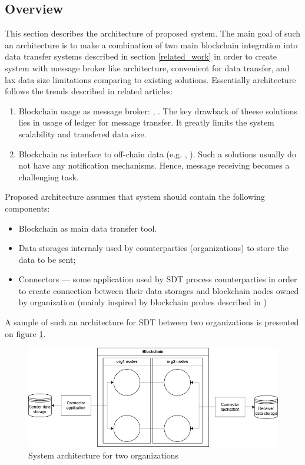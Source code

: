 \documentclass[10pt]{llncs}
\begin{document}
\subsection{Overview}

This section describes the architecture of proposed system.
The main goal of such an architecture is to make a combination of two main blockchain integration into data transfer systems described in section \ref{related_work}
in order to create system with message broker like architecture, convenient for data transfer, and lax data size limitations comparing to existing solutions.
Essentially architecture follows the trends described in related articles:

\begin{enumerate}
    \item Blockchain usage as message broker: \cite{Ghaemi2021}, \cite{kim2020hybrid}. 
    The key drawback of theese solutions lies in usage of ledger for message transfer.
    It greatly limits the system scalability and transfered data size. 
    \item Blockchain as interface to off-chain data (e.g. \cite{Jia2023}, \cite{Wang2024}).
    Such a solutions usually do not have any notification mechanisms.
    Hence, message receiving becomes a challenging task.
\end{enumerate}

Proposed architecture assumes that system should contain the following components:

\begin{itemize}
    \item Blockchain as main data transfer tool. 
    \item Data storages internaly used by counterparties (organizations) to store the data to be sent;
    \item Connectors --- some application used by SDT process counterparties in order to create connection between their data storages
    and blockchain nodes owned by organization (mainly inspired by blockchain probes described in \cite{Jia2023})
\end{itemize}

A sample of such an architecture for SDT between two organizations is presented on figure \ref{system_architecture}.

\begin{figure}
    \includegraphics[width=\textwidth]{system_architecture.png}
    \caption{System architecture for two organizations} \label{system_architecture}
\end{figure}
\end{document}
